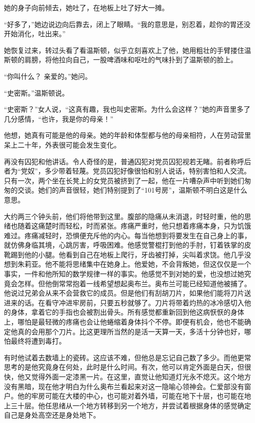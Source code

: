 她的身子向前倾去，她吐了，在地板上吐了好大一摊。

``好多了，''她边说边向后靠去，闭上了眼睛。``我的意思是，别忍着，趁你的胃还没开始消化，吐出来。''

她恢复过来，转过头看了看温斯顿，似乎立刻喜欢上了他，她用粗壮的手臂搂住温斯顿的肩膀，将他拉向自己，一股啤酒味和呕吐的气味扑到了温斯顿的脸上。

``你叫什么？ 亲爱的。''她问。

``史密斯。''温斯顿说。

``史密斯？''女人说，``这真有趣，我也叫史密斯。为什么会这样？''她的声音里多了几分感情，``也许，我是你的母亲！''

他想，她真有可能是他的母亲。她的年龄和体型都与他的母亲相符，人在劳动营里呆上二十年，外表很可能会发生变化。

再没有囚犯和他讲话。令人奇怪的是，普通囚犯对党员囚犯视若无睹。前者称呼后者为``党奴''，多少带着轻蔑。党员囚犯好像很怕和别人说话，特别害怕和人交流。只有一次，两个坐在长凳上的女党员被挤到了一起，他在一片嘈杂声中听到她们匆匆的交谈。她们的声音很轻，她们特别提到了``101号房''，温斯顿不明白这是什么意思。

大约两三个钟头前，他们将他带到这里。腹部的隐痛从未消退，时轻时重，他的思绪也随着这痛楚时而轻松，时而紧张。疼痛严重时，他只想着疼痛本身，只为饥饿难过。疼痛减轻时，恐惧便充斥他的内心。每当他想到将要发生在自己身上的事，就仿佛身临其境，心跳厉害，呼吸困难。他感觉警棍打到他的手肘，钉着铁掌的皮靴踢到他的小腿。他看到自己在地板上爬行，牙齿被打掉，尖叫着求饶。他几乎没想到朱莉亚。他不能将思绪集中在她身上。他爱她，不会背叛她，但这仅仅是一个事实，一件和他所知的数学规律一样的事实。他感觉不到对她的爱，也没想过她究竟会怎样。但他倒常常抱着一线希望想起奥布兰。奥布兰可能已经知道他被捕了。他说过兄弟会从来不会营救它的成员。但是他们有刮胡刀片，如果他们能将刀片送进来的话。在看守冲进牢房前，只要五秒就够了。刀片将带着灼热的冰冷感切入他的身体，拿着它的手指也会被割出骨头。所有感觉都重新回到他这病恹恹的身体上，哪怕是最轻微的疼痛也会让他蜷缩着身体抖个不停。即便有机会，他也不能确定他真的会用那个刀片。比这更理所当然的是活一天算一天，多活十分钟也好，哪怕最终将遭到毒打。

有时他试着去数墙上的瓷砖。这应该不难，但他总是忘记自己数了多少。而他更常思考的是他究竟身在何处，此时是什么时间。有次，他可以肯定外面是白天，但很快，他又觉得外面一定漆黑一片。在这里，直觉让他知道灯光永不熄灭。这个地方没有黑暗，现在他才明白为什么奥布兰看起来对这一隐喻心领神会。仁爱部没有窗户。他的牢房可能在大楼的中心，也可能对着外墙，可能在地下十层，也可能在地上三十层。他任思绪从一个地方转移到另一个地方，并尝试着根据身体的感觉确定自己是身处高空还是身处地下。

